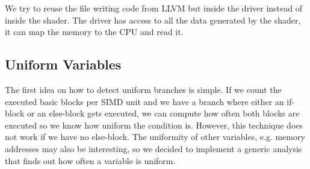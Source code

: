 We try to reuse the file writing code from LLVM but inside the driver instead of inside the shader.
The driver has access to all the data generated by the shader, it can map the memory to the CPU and read it.

\subsection{Uniform Variables}
\label{sub:uniformity}
The first idea on how to detect uniform branches is simple. If we count the executed basic blocks per SIMD unit and we have a branch where either an if-block or an else-block gets executed, we can compute how often both blocks are executed so we know how uniform the condition is.
However, this technique does not work if we have no else-block. The uniformity of other variables, e.g. memory addresses may also be interesting, so we decided to implement a generic analysis that finds out how often a variable is uniform.
